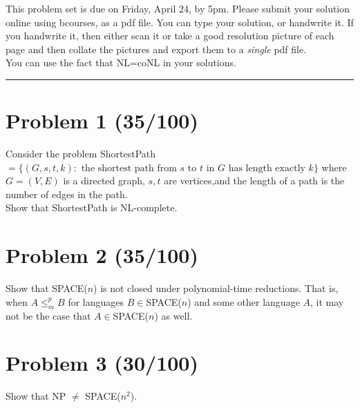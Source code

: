 \documentclass[11pt]{article}
\begin{document}
This problem set is due on Friday, April 24, by 5pm. Please submit your solution online using bcourses,
as a pdf file.
You can type your solution, or handwrite it. If you handwrite it, then either
scan it or take a good resolution picture of each page and then collate the pictures
and export them to a {\em single} pdf file.
\\

\noindent You can use the fact that NL=coNL in your solutions.
\bigskip
\hrule


\section*{Problem 1 (35/100)}
Consider the problem ShortestPath$= \{ (G,s,t,k) : \mbox { the shortest path  from }
s \mbox { to } t \mbox{ in } G \mbox{ has length exactly } k \}$ where $G=(V,E)$ is a directed graph, $s,t$ are vertices,and the length of a path is the number of edges in the path.
\\

\noindent Show that ShortestPath is NL-complete.

\section*{Problem 2 (35/100)}
Show that SPACE($n$) is not closed under polynomial-time reductions.  That is, when $A\leq^p_m B$ for languages $B\in$SPACE($n$) and some other language $A$, it may not be the case that $A\in$SPACE($n$) as well.
\\


\section*{Problem 3 (30/100)}
Show that NP $\neq$ SPACE($n^2$).
\end{document}
